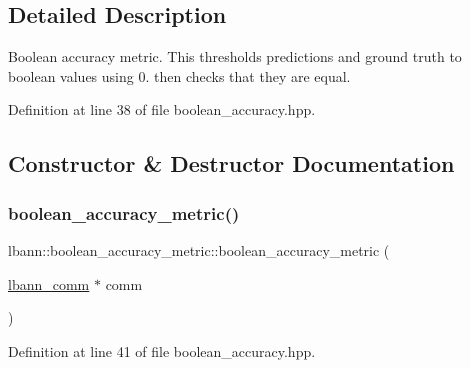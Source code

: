 \subsection{Detailed Description}
Boolean accuracy metric. This thresholds predictions and ground truth to boolean values using 0. then checks that they are equal. 

Definition at line 38 of file boolean\+\_\+accuracy.\+hpp.



\subsection{Constructor \& Destructor Documentation}
\mbox{\label{classlbann_1_1boolean__accuracy__metric_a91e8f2a608e0594e8875c58d584bda9c}} 
\subsubsection{\texorpdfstring{boolean\+\_\+accuracy\+\_\+metric()}{boolean\_accuracy\_metric()}\hspace{0.1cm}{\footnotesize\ttfamily [1/2]}}
{\footnotesize\ttfamily lbann\+::boolean\+\_\+accuracy\+\_\+metric\+::boolean\+\_\+accuracy\+\_\+metric (\begin{DoxyParamCaption}\item[{\hyperlink{classlbann_1_1lbann__comm}{lbann\+\_\+comm} $\ast$}]{comm }\end{DoxyParamCaption})\hspace{0.3cm}{\ttfamily [inline]}}



Definition at line 41 of file boolean\+\_\+accuracy.\+hpp.



